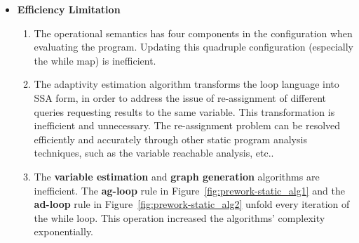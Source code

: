 {\begin{itemize}
\begin{itemize}
    Because the dependency graph relies on a specific memory, while-map, and a specific execution trace,
    the \emph{adaptivity} then is also defined w.r.t. one specific
    execution.
    In this sense, this adaptivity definition isn't the \emph{adaptivity} of the adaptive data analysis
    implemented by this program,
    but only its \emph{adaptivity} in a certain execution.
    \item
    The adaptivity bound computed from this framework is loose.
    Because the adaptivity estimation algorithm composes three standard static analysis techniques straightforwardly.
    The \textbf{graph generation} algorithm that uses the standard data-flow analysis technique
    over-approximates the data dependency relation in a large scale.
    And the standard path search algorithm also over-approximates the longest weighted path on this over-approximated dependency graph. 
    In this sense, the estimated adaptivity is a loose bound on the defined adaptivity.
 \end{itemize}
 \item \textbf{Efficiency Limitation}
 \begin{enumerate}
    \item The operational semantics has four components in the configuration when evaluating the program. 
    Updating this quadruple configuration (especially the while map) is inefficient.   
    \item
    The adaptivity estimation algorithm transforms the loop language into SSA form, in order to address the issue of re-assignment of different queries requesting results to the same variable.
    This transformation is inefficient and unnecessary.
    The re-assignment problem can be resolved efficiently and accurately through other static program analysis techniques, such as the
    variable reachable analysis, etc..
    \item The \textbf{variable estimation} and \textbf{graph generation} algorithms are inefficient.
    The \textbf{ag-loop} rule in Figure~\ref{fig:prework-static_alg1}
   and the \textbf{ad-loop} rule in Figure~\ref{fig:prework-static_alg2}
   unfold every iteration of the while loop.
   This operation increased the algorithms' complexity exponentially. 
    \end{enumerate}
\end{itemize}
}  